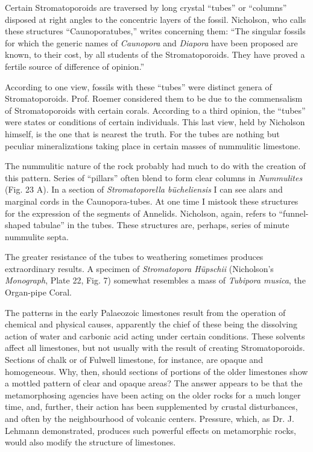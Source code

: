 \documentclass[a4paper, 12pt, oneside]{article}
\begin{document}
Certain Stromatoporoids are traversed by long crystal ``tubes'' or ``columns'' disposed at right angles to the concentric layers of the fossil. Nicholson, who calls these structures ``Caunoporatubes,'' writes concerning them: ``The singular fossils for which the generic names of \emph{Caunopora} and \emph{Diapora} have been proposed are known, to their cost, by all students of the Stromatoporoids. They have proved a fertile source of difference of opinion.''

According to one view, fossils with these ``tubes'' were distinct genera of Stromatoporoids. Prof. Roemer considered them to be due to the commensalism of Stromatoporoids with certain corals. According to a third opinion, the ``tubes'' were states or conditions of certain individuals. This last view, held by Nicholson himself, is the one that is nearest the truth. For the tubes are nothing but peculiar mineralizations taking place in certain masses of nummulitic limestone.

The nummulitic nature of the rock probably had much to do with the creation of this pattern. Series of ``pillars'' often blend to form clear columns in \emph{Nummulites} (Fig. 23 A). In a section of \emph{Stromatoporella bücheliensis} I can see alars and marginal cords in the Caunopora-tubes. At one time I mistook these structures for the expression of the segments of Annelids. Nicholson, again, refers to ``funnel-shaped tabulae'' in the tubes. These structures are, perhaps, series of minute nummulite septa.

The greater resistance of the tubes to weathering sometimes produces extraordinary results. A specimen of \emph{Stromatopora Hüpschii} (Nicholson's \emph{Monograph}, Plate 22, Fig. 7) somewhat resembles a mass of \emph{Tubipora musica}, the Organ-pipe Coral.

The patterns in the early Palaeozoic limestones result from the operation of chemical and physical causes, apparently the chief of these being the dissolving action of water and carbonic acid acting under certain conditions. These solvents affect all limestones, but not usually with the result of creating Stromatoporoids. Sections of chalk or of Fulwell limestone, for instance, are opaque and homogeneous. Why, then, should sections of portions of the older limestones show a mottled pattern of clear and opaque areas? The answer appears to be that the metamorphosing agencies have been acting on the older rocks for a much longer time, and, further, their action has been supplemented by crustal disturbances, and often by the neighbourhood of volcanic centers. Pressure, which, as Dr. J. Lehmann demonstrated, produces such powerful effects on metamorphic rocks, would also modify the structure of limestones.
\end{document}
